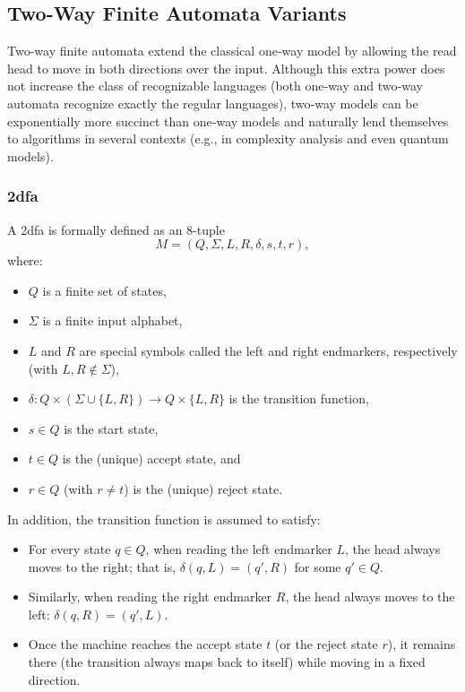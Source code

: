
\subsection{Two-Way Finite Automata Variants}
\label{subsec:two-way-variants}

Two-way finite automata extend the classical one‐way model by allowing the read head to move in both directions over the input. Although this extra power does not increase the class of recognizable languages (both one‐way and two‐way automata recognize exactly the regular languages), two‐way models can be exponentially more succinct than one‐way models and naturally lend themselves to algorithms in several contexts (e.g., in complexity analysis and even quantum models).


\subsubsection{\acrfull{2dfa}}
\label{subsubsec:2dfa}

\begin{definition}
A \gls{2dfa} is formally defined as an 8-tuple 
\[
M = (Q, \Sigma, L, R, \delta, s, t, r),
\]
where:
\begin{itemize}
  \item \(Q\) is a finite set of states,
  \item \(\Sigma\) is a finite input alphabet,
  \item \(L\) and \(R\) are special symbols called the left and right endmarkers, respectively (with \(L,R \notin \Sigma\)),
  \item \(\delta: Q \times (\Sigma \cup \{L, R\}) \to Q \times \{L, R\}\) is the transition function,
  \item \(s\in Q\) is the start state,
  \item \(t\in Q\) is the (unique) accept state, and
  \item \(r\in Q\) (with \(r\neq t\)) is the (unique) reject state.
\end{itemize}
In addition, the transition function is assumed to satisfy:
\begin{itemize}
  \item For every state \(q\in Q\), when reading the left endmarker \(L\), the head always moves to the right; that is, \(\delta(q,L) = (q', R)\) for some \(q'\in Q\).
  \item Similarly, when reading the right endmarker \(R\), the head always moves to the left: \(\delta(q,R) = (q', L)\).
  \item Once the machine reaches the accept state \(t\) (or the reject state \(r\)), it remains there (the transition always maps back to itself) while moving in a fixed direction.
\end{itemize}
\end{definition}

